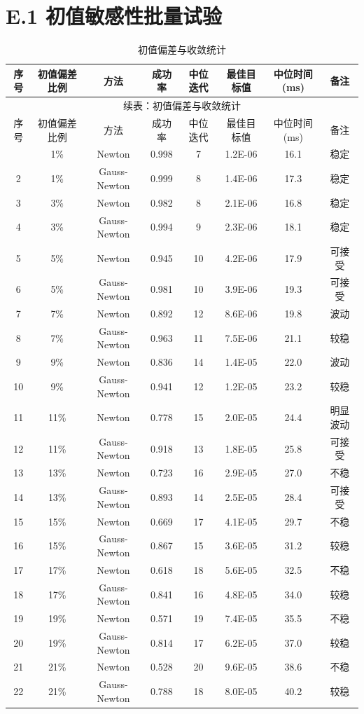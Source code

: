 \section*{E.1 初值敏感性批量试验}
{
\footnotesize
\begin{longtable}{cccccccc}
\caption{初值偏差与收敛统计}\\
\toprule
序号 & 初值偏差比例 & 方法 & 成功率 & 中位迭代 & 最佳目标值 & 中位时间(ms) & 备注\\
\midrule
\endfirsthead
\multicolumn{8}{c}{续表：初值偏差与收敛统计}\\
\toprule
序号 & 初值偏差比例 & 方法 & 成功率 & 中位迭代 & 最佳目标值 & 中位时间(ms) & 备注\\
\midrule
\endhead
\bottomrule
\endfoot
1&1\%&Newton&0.998&7&1.2E-06&16.1&稳定\\
2&1\%&Gauss-Newton&0.999&8&1.4E-06&17.3&稳定\\
3&3\%&Newton&0.982&8&2.1E-06&16.8&稳定\\
4&3\%&Gauss-Newton&0.994&9&2.3E-06&18.1&稳定\\
5&5\%&Newton&0.945&10&4.2E-06&17.9&可接受\\
6&5\%&Gauss-Newton&0.981&10&3.9E-06&19.3&可接受\\
7&7\%&Newton&0.892&12&8.6E-06&19.8&波动\\
8&7\%&Gauss-Newton&0.963&11&7.5E-06&21.1&较稳\\
9&9\%&Newton&0.836&14&1.4E-05&22.0&波动\\
10&9\%&Gauss-Newton&0.941&12&1.2E-05&23.2&较稳\\
11&11\%&Newton&0.778&15&2.0E-05&24.4&明显波动\\
12&11\%&Gauss-Newton&0.918&13&1.8E-05&25.8&可接受\\
13&13\%&Newton&0.723&16&2.9E-05&27.0&不稳\\
14&13\%&Gauss-Newton&0.893&14&2.5E-05&28.4&可接受\\
15&15\%&Newton&0.669&17&4.1E-05&29.7&不稳\\
16&15\%&Gauss-Newton&0.867&15&3.6E-05&31.2&较稳\\
17&17\%&Newton&0.618&18&5.6E-05&32.5&不稳\\
18&17\%&Gauss-Newton&0.841&16&4.8E-05&34.0&较稳\\
19&19\%&Newton&0.571&19&7.4E-05&35.5&不稳\\
20&19\%&Gauss-Newton&0.814&17&6.2E-05&37.0&较稳\\
21&21\%&Newton&0.528&20&9.6E-05&38.6&不稳\\
22&21\%&Gauss-Newton&0.788&18&8.0E-05&40.2&较稳\\

\end{longtable}}
